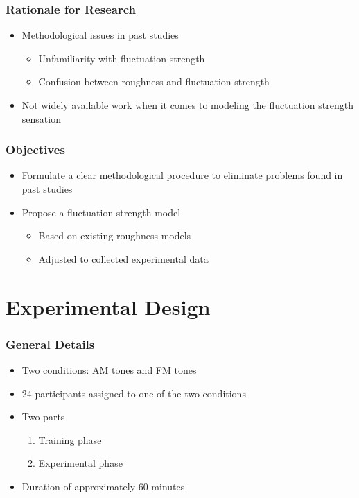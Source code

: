 \documentclass{beamer}
\begin{document}
\begin{frame}
  \frametitle{Rationale for Research}
  \begin{itemize}
    \item Methodological issues in past studies
    \pause{}
    \begin{itemize}
      \item Unfamiliarity with fluctuation strength
      \pause{}
      \item Confusion between roughness and fluctuation strength
    \end{itemize}
    \pause{}
    \item Not widely available work when it comes to modeling the fluctuation
      strength sensation
  \end{itemize}
\end{frame}

\begin{frame}
  \frametitle{Objectives}
  \begin{itemize}
    \item Formulate a clear methodological procedure to eliminate problems
      found in past studies
    \pause{}
    \item Propose a fluctuation strength model
    \pause{}
    \begin{itemize}
      \item Based on existing roughness models
      \pause{}
      \item Adjusted to collected experimental data
    \end{itemize}
  \end{itemize}
\end{frame}

\section{Experimental Design}

\begin{frame}
  \frametitle{General Details}
  \begin{itemize}
    \item Two conditions: AM tones and FM tones
    \pause{}
    \item 24 participants assigned to one of the two conditions
    \pause{}
    \item Two parts
      \begin{enumerate}
        \item Training phase
        \item Experimental phase
      \end{enumerate}
    \pause{}
    \item Duration of approximately 60 minutes
  \end{itemize}
\end{frame}
\end{document}
